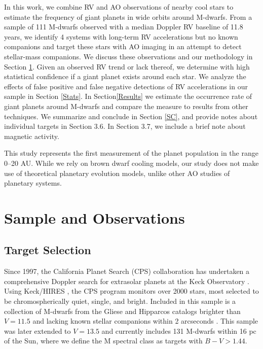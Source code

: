 In this work, we combine RV and AO observations of nearby cool stars to estimate the frequency of giant planets in wide orbits around M-dwarfs. From a sample of 111 M-dwarfs observed with a median Doppler RV baseline of 11.8 years, we identify 4 systems with long-term RV accelerations but no known companions and target these stars with AO imaging in an attempt to detect stellar-mass companions. We discuss these observations and our methodology in Section \ref{SO}. Given an observed RV trend or lack thereof, we determine with high statistical confidence if a giant planet exists around each star. We analyze the effects of false positive and false negative detections of RV accelerations in our sample in Section \ref{Stats}. In Section\ref{Results} we estimate the occurrence rate of giant planets around M-dwarfs and compare the measure to results from other techniques. We summarize and conclude in Section \ref{SC}, and 
provide notes about individual targets in Section 3.6.
In Section 3.7, we include a brief note about magnetic activity.

 This study represents the first measurement of the planet population in the range 0--20 AU. While we rely on brown dwarf cooling models, our study does not make use of theoretical planetary evolution models, unlike other AO studies of planetary systems.

\section{Sample and Observations}
\label{SO}
\subsection{Target Selection}
\label{TS}

Since 1997, the California Planet Search (CPS) collaboration has undertaken a comprehensive Doppler search for extrasolar planets at the Keck Observatory \citep[e.g. ][]{Howard10}. Using Keck/HIRES \citep{Vogt94}, the CPS program monitors over 2000 stars, most selected to be chromospherically quiet, single, and bright. Included in this sample is a collection of M-dwarfs from the Gliese and Hipparcos catalogs brighter than $V = 11.5$ and lacking known stellar companions within 2 arcseconds \citep{Rauscher06}. This sample was later extended to $V = 13.5$ and currently includes 131 M-dwarfs within 16 pc of the Sun, where we define the M spectral class as targets with $B-V > 1.44$.

